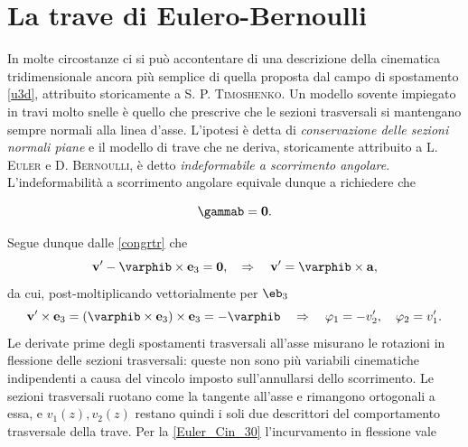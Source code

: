 \section{La trave di Eulero-Bernoulli}
In molte circostanze ci si può accontentare di una descrizione della cinematica tridimensionale ancora più semplice di quella proposta dal campo di spostamento \eqref{u3d},  attribuito storicamente a \textsc{S. P. Timoshenko}.
Un modello sovente impiegato in travi molto snelle è  quello che prescrive che le sezioni trasversali si mantengano sempre normali alla linea d'asse. L'ipotesi è detta di \emph{conservazione delle sezioni normali piane} e 
il modello di trave che ne deriva, storicamente attribuito a \textsc{L. Euler} e \textsc{D. Bernoulli}, \`e detto \emph{indeformabile a scorrimento angolare}.
L'indeformabilit\`a a scorrimento angolare equivale dunque a richiedere che 
\begin{definition}
	\begin{equation}
	\gammab=\mathbf{0}.
\end{equation}
\end{definition}
Segue dunque dalle \eqref{congrtr} che 
\begin{equation}\label{Euler}
	\mathbf{v}^{\prime}-\varphib\times\mathbf{e}_3=\mathbf{0}, 
	\quad
	\Rightarrow
	\quad
	\mathbf{v}^{\prime}=\varphib
	\times\mathbf{a},
\end{equation}
da cui, post-moltiplicando vettorialmente per $\eb_3$
\begin{equation}\label{Euler_Cin_30}
	\mathbf{v}^{\prime}\times\mathbf{e}_3=(\varphib\times\mathbf{e}_3)\times\mathbf{e}_3=-\varphib
	\quad
	\Rightarrow
	\quad
	\varphi_1=-v_2^{\prime},
	\quad 
	\varphi_2=v_1^{\prime}.
\end{equation}
Le derivate prime degli spostamenti trasversali all'asse misurano le rotazioni in flessione delle sezioni trasversali: queste non sono pi\`{u} variabili cinematiche 
indipendenti a causa del vincolo  imposto sull'annullarsi dello scorrimento. Le sezioni trasversali ruotano come la tangente all'asse e rimangono ortogonali a essa, e $v_1(z),v_2(z)$ restano quindi i 
soli due descrittori del comportamento trasversale della trave. 
Per la \eqref{Euler_Cin_30} l'incurvamento in flessione vale
